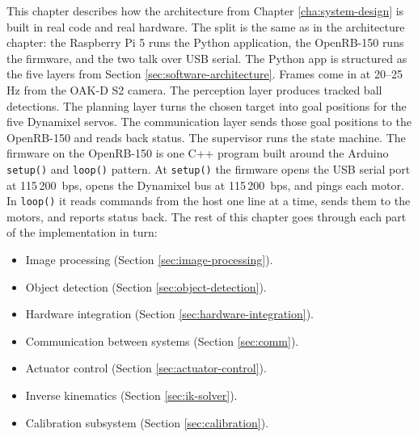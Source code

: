 This chapter describes how the architecture from
Chapter \ref{cha:system-design} is built in real code and real
hardware. The split is the same as in the architecture chapter: the
Raspberry Pi 5 runs the Python application, the OpenRB-150 runs the
firmware, and the two talk over USB serial.
The Python app is structured as the five layers from
Section \ref{sec:software-architecture}. Frames come in at 20--25 Hz
from the OAK-D S2 camera. The perception layer produces tracked ball detections.
The planning layer turns the chosen target into goal positions for the
five Dynamixel servos. The communication layer sends those goal
positions to the OpenRB-150 and reads back status. The supervisor
runs the state machine.
The firmware on the OpenRB-150 is one C++ program built around the
Arduino \texttt{setup()} and \texttt{loop()} pattern. At
\texttt{setup()} the firmware opens the USB serial port at 115\,200~bps,
opens the Dynamixel bus at 115\,200~bps, and pings each motor. In
\texttt{loop()} it reads commands from the host one line at a time,
sends them to the motors, and reports status back.
The rest of this chapter goes through each part of the implementation
in turn:
\begin{itemize}
 \item Image processing (Section \ref{sec:image-processing}).
 \item Object detection (Section \ref{sec:object-detection}).
 \item Hardware integration (Section \ref{sec:hardware-integration}).
 \item Communication between systems (Section \ref{sec:comm}).
 \item Actuator control (Section \ref{sec:actuator-control}).
 \item Inverse kinematics (Section \ref{sec:ik-solver}).
 \item Calibration subsystem (Section \ref{sec:calibration}).
\end{itemize}
